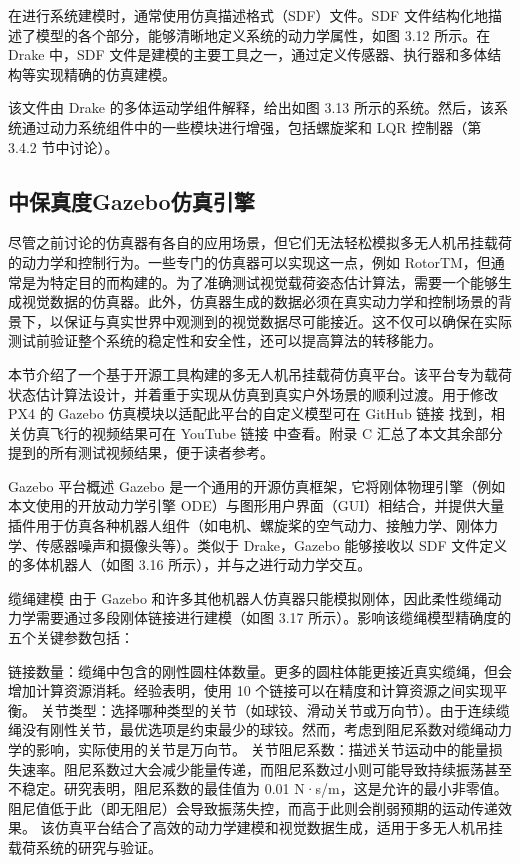 \documentclass[lang=chs, degree=master, blindreview=false, winfonts=true]{yanputhesis}
\begin{document}
在进行系统建模时，通常使用仿真描述格式（SDF）文件。SDF 文件结构化地描述了模型的各个部分，能够清晰地定义系统的动力学属性，如图 3.12 所示。在 Drake 中，SDF 文件是建模的主要工具之一，通过定义传感器、执行器和多体结构等实现精确的仿真建模。


该文件由 Drake 的多体运动学组件解释，给出如图 3.13 所示的系统。然后，该系统通过动力系统组件中的一些模块进行增强，包括螺旋桨和 LQR 控制器（第 3.4.2 节中讨论）。



\subsection{中保真度Gazebo仿真引擎}
尽管之前讨论的仿真器有各自的应用场景，但它们无法轻松模拟多无人机吊挂载荷的动力学和控制行为。一些专门的仿真器可以实现这一点，例如 RotorTM，但通常是为特定目的而构建的。为了准确测试视觉载荷姿态估计算法，需要一个能够生成视觉数据的仿真器。此外，仿真器生成的数据必须在真实动力学和控制场景的背景下，以保证与真实世界中观测到的视觉数据尽可能接近。这不仅可以确保在实际测试前验证整个系统的稳定性和安全性，还可以提高算法的转移能力。

本节介绍了一个基于开源工具构建的多无人机吊挂载荷仿真平台。该平台专为载荷状态估计算法设计，并着重于实现从仿真到真实户外场景的顺利过渡。用于修改 PX4 的 Gazebo 仿真模块以适配此平台的自定义模型可在 GitHub 链接 找到，相关仿真飞行的视频结果可在 YouTube 链接 中查看。附录 C 汇总了本文其余部分提到的所有测试视频结果，便于读者参考。

Gazebo 平台概述
Gazebo 是一个通用的开源仿真框架，它将刚体物理引擎（例如本文使用的开放动力学引擎 ODE）与图形用户界面（GUI）相结合，并提供大量插件用于仿真各种机器人组件（如电机、螺旋桨的空气动力、接触力学、刚体力学、传感器噪声和摄像头等）。类似于 Drake，Gazebo 能够接收以 SDF 文件定义的多体机器人（如图 3.16 所示），并与之进行动力学交互。

缆绳建模
由于 Gazebo 和许多其他机器人仿真器只能模拟刚体，因此柔性缆绳动力学需要通过多段刚体链接进行建模（如图 3.17 所示）。影响该缆绳模型精确度的五个关键参数包括：

链接数量：缆绳中包含的刚性圆柱体数量。更多的圆柱体能更接近真实缆绳，但会增加计算资源消耗。经验表明，使用 10 个链接可以在精度和计算资源之间实现平衡。
关节类型：选择哪种类型的关节（如球铰、滑动关节或万向节）。由于连续缆绳没有刚性关节，最优选项是约束最少的球铰。然而，考虑到阻尼系数对缆绳动力学的影响，实际使用的关节是万向节。
关节阻尼系数：描述关节运动中的能量损失速率。阻尼系数过大会减少能量传递，而阻尼系数过小则可能导致持续振荡甚至不稳定。研究表明，阻尼系数的最佳值为 0.01 N·s/m，这是允许的最小非零值。阻尼值低于此（即无阻尼）会导致振荡失控，而高于此则会削弱预期的运动传递效果。
该仿真平台结合了高效的动力学建模和视觉数据生成，适用于多无人机吊挂载荷系统的研究与验证。
\end{document}

